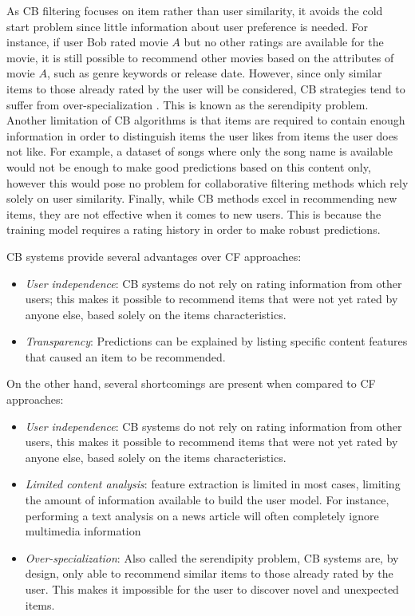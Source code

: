 \documentclass[cic,tc,english]{iiufrgs}
\begin{document}
As CB filtering focuses on item rather than user similarity, it avoids the cold start problem since little information about user preference is needed. For instance, if user Bob rated movie $A$ but no other ratings are available for the movie, it is still possible to recommend other movies based on the attributes of movie $A$, such as genre keywords or release date. However, since only similar items to those already rated by the user will be considered, CB strategies tend to suffer from over-specialization \cite{Iaquinta2008}. This is known as the serendipity problem. Another limitation of CB algorithms is that items are required to contain enough information in order to distinguish items the user likes from items the user does not like. For example, a dataset of songs where only the song name is available would not be enough to make good predictions based on this content only, however this would pose no problem for collaborative filtering methods which rely solely on user similarity. Finally, while CB methods excel in recommending new items, they are not effective when it comes to new users. This is because the training model requires a rating history in order to make robust predictions.

CB systems provide several advantages over CF approaches:
\begin{itemize}
\item \emph{User independence}: CB systems do not rely on rating information from other users; this makes it possible to recommend items that were not yet rated by anyone else, based solely on the items characteristics. 
\item \emph{Transparency}: Predictions can be explained by listing specific content features that caused an item to be recommended.
\end{itemize}
On the other hand, several shortcomings are present when compared to CF approaches:
\begin{itemize}
\item \emph{User independence}: CB systems do not rely on rating information from other users, this makes it possible to recommend items that were not yet rated by anyone else, based solely on the items characteristics. 
\item \emph{Limited content analysis}: feature extraction is limited in most cases, limiting the amount of information available to build the user model. For instance, performing a text analysis on a news article will often completely ignore multimedia information
\item \emph{Over-specialization}: Also called the serendipity problem, CB systems are, by design, only able to recommend similar items to those already rated by the user. This makes it impossible for the user to discover novel and unexpected items.
\end{itemize}
\end{document}
